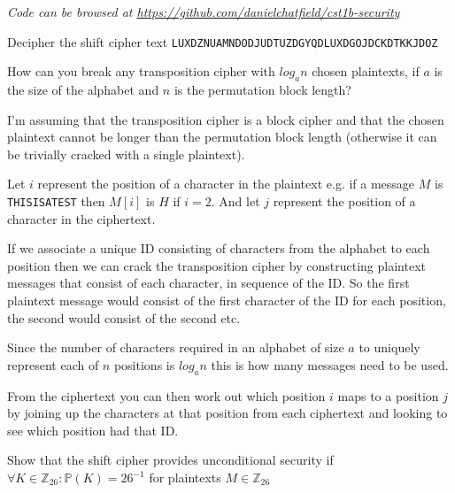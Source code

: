 \documentclass{supervision}
\begin{document}
  \emph{Code can be browsed at
  \url{https://github.com/danielchatfield/cst1b-security}}

  \begin{questions}
    \question Decipher the shift cipher text
      \lstinline|LUXDZNUAMNDODJUDTUZDGYQDLUXDGOJDCKDTKKJDOZ|

      \begin{solution}
      \end{solution}

    \question How can you break any transposition cipher with $log_a n$ chosen
      plaintexts, if $a$ is the size of the alphabet and $n$ is the permutation
      block length?

      \begin{solution}
        I'm assuming that the transposition cipher is a block cipher and
        that the chosen plaintext cannot be longer than the permutation block
        length (otherwise it can be trivially cracked with a single plaintext).

        Let $i$ represent the position of a character in the plaintext e.g. if
        a message $M$ is \lstinline|THISISATEST| then $M[i]$ is $H$ if $i=2$.
        And let $j$ represent the position of a character in the ciphertext.

        If we associate a unique ID consisting of characters from the alphabet
        to each position then we can crack the transposition cipher by
        constructing plaintext messages that consist of each character, in
        sequence of the ID. So the first plaintext message would consist of
        the first character of the ID for each position, the second would
        consist of the second etc.

        Since the number of characters required in an alphabet of size $a$ to
        uniquely represent each of $n$ positions is $log_a n$ this is how many
        messages need to be used.

        From the ciphertext you can then work out which position $i$ maps to a
        position $j$ by joining up the characters at that position from each
        ciphertext and looking to see which position had that ID.
      \end{solution}

    \question Show that the shift cipher provides unconditional security if
      $\forall K \in \mathbb{Z}_{26} : \mathbb{P}(K) = 26^{-1}$ for plaintexts
      $M \in \mathbb{Z}_{26}$


\end{questions}
\end{document}
